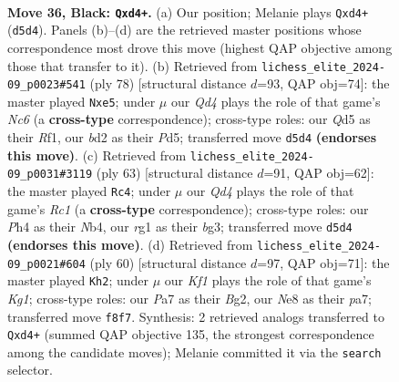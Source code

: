 \documentclass[11pt]{article}
\begin{document}
\clearpage

\begin{figure}[p]\centering
\begin{subfigure}{0.46\textwidth}\centering
\resizebox{\linewidth}{!}{%
\newchessgame
\chessboard[
  setfen={1r1rnk2/p1p5/2P2p2/3q4/3P1P1p/1P6/1Q1B1KRP/5BR1 b - - 0 36},
  showmover=false,
  pgfstyle=straightmove, color=movearrow, markmove={d5-d4}
]}
\caption{}
\end{subfigure}\hfill
\begin{subfigure}{0.46\textwidth}\centering
\resizebox{\linewidth}{!}{%
\newchessgame
\chessboard[
  setfen={5rk1/p4rb1/2N5/1PQPp2p/q5p1/5pP1/7P/4RR1K w - - 0 40},
  showmover=false,
  pgfstyle=straightmove, color=movearrow, markmove={c6-e5}
]}
\caption{}
\end{subfigure}
\\[4pt]
\begin{subfigure}{0.46\textwidth}\centering
\resizebox{\linewidth}{!}{%
\newchessgame
\chessboard[
  setfen={2r1r3/1p3pk1/4q3/pP2P1p1/1n4P1/4Q1B1/5PK1/2RR4 b - - 1 32},
  showmover=false,
  pgfstyle=straightmove, color=movearrow, markmove={c8-c4}
]}
\caption{}
\end{subfigure}\hfill
\begin{subfigure}{0.46\textwidth}\centering
\resizebox{\linewidth}{!}{%
\newchessgame
\chessboard[
  setfen={2r3k1/p1r2b2/2q1pQ2/3p1p1p/P4P1P/6P1/6B1/R3R1K1 w - - 0 31},
  showmover=false,
  pgfstyle=straightmove, color=movearrow, markmove={g1-h2}
]}
\caption{}
\end{subfigure}
\caption{\textbf{Move 36, Black: \texttt{Qxd4+}.} (a) Our position; Melanie plays \texttt{Qxd4+} (\texttt{d5d4}). Panels (b)--(d) are the retrieved master positions whose correspondence most drove this move (highest QAP objective among those that transfer to it). (b) Retrieved from \texttt{lichess\_elite\_2024-09\_p0023\#541} (ply 78) [structural distance $d$=93, QAP obj=74]: the master played \texttt{Nxe5}; under $\mu$ our \emph{Qd4} plays the role of that game's \emph{Nc6} (a \textbf{cross-type} correspondence); cross-type roles: our \emph{Q}d5 as their \emph{R}f1, our \emph{b}d2 as their \emph{P}d5; transferred move \texttt{d5d4} \textbf{(endorses this move)}. (c) Retrieved from \texttt{lichess\_elite\_2024-09\_p0031\#3119} (ply 63) [structural distance $d$=91, QAP obj=62]: the master played \texttt{Rc4}; under $\mu$ our \emph{Qd4} plays the role of that game's \emph{Rc1} (a \textbf{cross-type} correspondence); cross-type roles: our \emph{P}h4 as their \emph{N}b4, our \emph{r}g1 as their \emph{b}g3; transferred move \texttt{d5d4} \textbf{(endorses this move)}. (d) Retrieved from \texttt{lichess\_elite\_2024-09\_p0021\#604} (ply 60) [structural distance $d$=97, QAP obj=71]: the master played \texttt{Kh2}; under $\mu$ our \emph{Kf1} plays the role of that game's \emph{Kg1}; cross-type roles: our \emph{P}a7 as their \emph{B}g2, our \emph{N}e8 as their \emph{p}a7; transferred move \texttt{f8f7}. Synthesis: 2 retrieved analogs transferred to \texttt{Qxd4+} (summed QAP objective 135, the strongest correspondence among the candidate moves); Melanie committed it via the \texttt{search} selector.}
\label{fig:thought-m71}
\end{figure}
\end{document}
